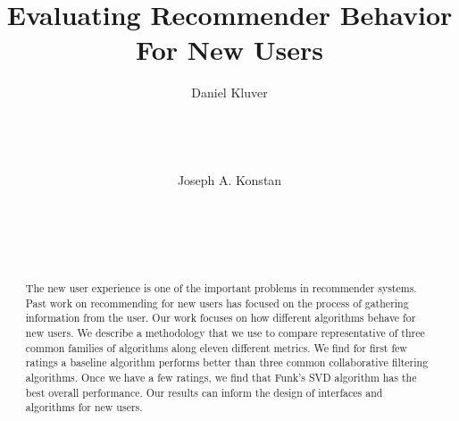 \documentclass[letterpaper]{sig-alternate}
\begin{document}

\title{Evaluating Recommender Behavior For New Users}


\author {
\alignauthor
Daniel Kluver\\
\\
\\
\\
\\
\alignauthor
Joseph A. Konstan\\
\\
\\
\\
\\
}

\maketitle
\begin{abstract}

  The new user experience is one of the important problems in recommender systems.
  Past work on recommending for new users has focused on the process of gathering information from the user.
  Our work focuses on how different algorithms behave for new users.
  We describe a methodology that we use to compare representative of three common families of algorithms along eleven different metrics.
  We find for first few ratings a baseline algorithm performs better than three common collaborative filtering algorithms.
  Once we have a few ratings, we find that Funk's SVD algorithm has the best overall performance.
  Our results can inform the design of interfaces and algorithms for new users.

\end{abstract}

\end{document}
